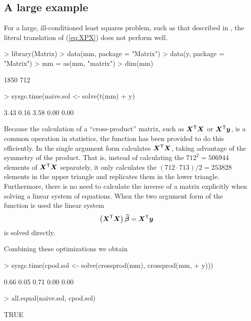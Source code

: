\documentclass{article}
\begin{document}
\subsection{A large example}
\label{sec:largeLSQ}

For a large, ill-conditioned least squares problem, such as that
described in \citet{koen:ng:2003}, the literal translation of
(\ref{eq:XPX}) does not perform well.
\begin{Schunk}
\begin{Sinput}
> library(Matrix)
> data(mm, package = "Matrix")
> data(y, package = "Matrix")
> mm = as(mm, "matrix")
> dim(mm)
\end{Sinput}
\begin{Soutput}
[1] 1850  712
\end{Soutput}
\begin{Sinput}
> sysgc.time(naive.sol <- solve(t(mm) %*% mm) %*% t(mm) %*% 
+     y)
\end{Sinput}
\begin{Soutput}
[1] 3.43 0.16 3.58 0.00 0.00
\end{Soutput}
\end{Schunk}

Because the calculation of a ``cross-product'' matrix, such as
$\bm{X}^\mathsf{T}\bm{X}$ or $\bm{X}^\mathsf{T}\bm{y}$, is a common operation in
statistics, the  function has been provided to do
this efficiently.  In the single argument form 
calculates $\bm{X}^\mathsf{T}\bm{X}$, taking advantage of the symmetry of the
product.  That is, instead of calculating the $712^2=506944$ elements of
$\bm{X}^\mathsf{T}\bm{X}$ separately, it only calculates the $(712\cdot
713)/2=253828$ elements in the upper triangle and replicates them in
the lower triangle. Furthermore, there is no need to calculate the
inverse of a matrix explicitly when solving a
linear system of equations.  When the two argument form of the 
function is used the linear system
\begin{equation}
  \label{eq:LSQsol}
  \left(\bm{X}^\mathsf{T}\bm{X}\right) \widehat{\bm{\beta}} = \bm{X}^\mathsf{T}\bm{y}
\end{equation}
is solved directly.

Combining these optimizations we obtain
\begin{Schunk}
\begin{Sinput}
> sysgc.time(cpod.sol <- solve(crossprod(mm), crossprod(mm, 
+     y)))
\end{Sinput}
\begin{Soutput}
[1] 0.66 0.05 0.71 0.00 0.00
\end{Soutput}
\begin{Sinput}
> all.equal(naive.sol, cpod.sol)
\end{Sinput}
\begin{Soutput}
[1] TRUE
\end{Soutput}
\end{Schunk}
\end{document}
